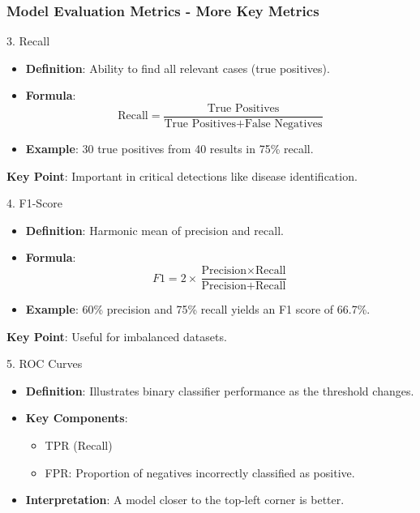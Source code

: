 \documentclass[aspectratio=169]{beamer}
\begin{document}
\begin{frame}[fragile]
    \frametitle{Model Evaluation Metrics - More Key Metrics}
    
    \begin{block}{3. Recall}
        \begin{itemize}
            \item \textbf{Definition}: Ability to find all relevant cases (true positives).
            \item \textbf{Formula}:
            \[
            \text{Recall} = \frac{\text{True Positives}}{\text{True Positives} + \text{False Negatives}}
            \]
            \item \textbf{Example}: 30 true positives from 40 results in 75\% recall.
        \end{itemize}
        
        \textbf{Key Point}: Important in critical detections like disease identification.
    \end{block}
    
    \begin{block}{4. F1-Score}
        \begin{itemize}
            \item \textbf{Definition}: Harmonic mean of precision and recall.
            \item \textbf{Formula}:
            \[
            F1 = 2 \times \frac{\text{Precision} \times \text{Recall}}{\text{Precision} + \text{Recall}}
            \]
            \item \textbf{Example}: 60\% precision and 75\% recall yields an F1 score of 66.7\%.
        \end{itemize}
        
        \textbf{Key Point}: Useful for imbalanced datasets.
    \end{block}
    
    \begin{block}{5. ROC Curves}
        \begin{itemize}
            \item \textbf{Definition}: Illustrates binary classifier performance as the threshold changes.
            \item \textbf{Key Components}:
            \begin{itemize}
                \item TPR (Recall)
                \item FPR: Proportion of negatives incorrectly classified as positive.
            \end{itemize}
            \item \textbf{Interpretation}: A model closer to the top-left corner is better.
        \end{itemize}
    \end{block}
\end{frame}
\end{document}
